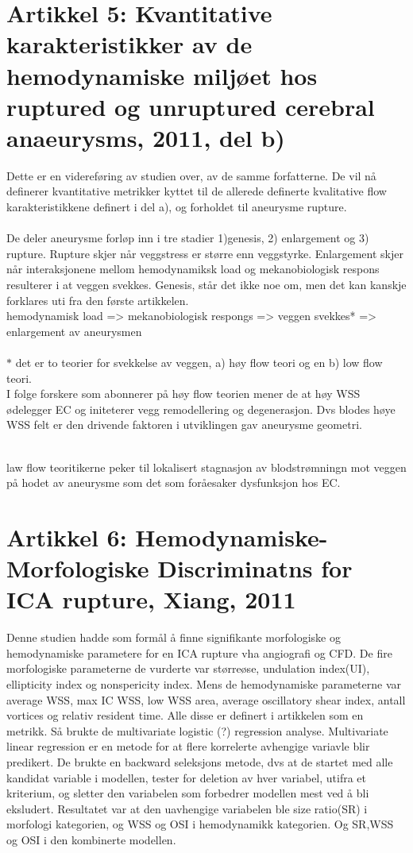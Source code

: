 \documentclass{article}
\begin{document}
\section{Artikkel 5: Kvantitative karakteristikker av de hemodynamiske miljøet hos ruptured og unruptured cerebral anaeurysms, 2011, del b)}

Dette er en videreføring av studien over, av de samme forfatterne. De vil nå definerer kvantitative metrikker kyttet til de allerede definerte kvalitative flow karakteristikkene definert i del a), og forholdet til aneurysme rupture. 
\\
\\De deler aneurysme forløp inn i tre stadier 1)genesis, 2) enlargement og 3) rupture. Rupture skjer når veggstress er større enn veggstyrke. Enlargement skjer når interaksjonene mellom hemodynamiksk load og mekanobiologisk respons resulterer i at veggen svekkes. 
Genesis, står det ikke noe om, men det kan kanskje forklares uti fra den første artikkelen. 
\\
hemodynamisk load => mekanobiologisk respongs => veggen svekkes* => enlargement av aneurysmen 
\\
\\$*$ det er to teorier for svekkelse av veggen, a) høy flow teori og en b) low flow teori. 
\\ I folge forskere som abonnerer på høy flow teorien mener de at høy WSS ødelegger EC og initeterer vegg remodellering og degenerasjon. Dvs blodes høye WSS felt er den drivende faktoren i utviklingen gav aneurysme geometri. 

\\law flow teoritikerne peker til lokalisert stagnasjon av blodstrømningn mot veggen på hodet av aneurysme som det som foråesaker dysfunksjon hos EC.

\section{Artikkel 6: Hemodynamiske- Morfologiske Discriminatns for ICA rupture, Xiang, 2011 }

Denne studien hadde som formål å finne signifikante morfologiske og hemodynamiske parametere for en ICA rupture vha angiografi og CFD.
De fire morfologiske parameterne de vurderte var størreøse, undulation index(UI), ellipticity index og nonspericity index. Mens de hemodynamiske parameterne var average WSS, max IC WSS, low WSS area, average oscillatory shear index, antall vortices og relativ resident time. 
Alle disse er definert i artikkelen som en metrikk.
Så brukte de multivariate logistic (?) regression analyse. 
Multivariate linear regression er en metode for at flere korrelerte avhengige variavle blir predikert. De brukte en backward seleksjons metode, dvs at de startet med alle kandidat variable i modellen, tester for deletion av hver variabel, utifra et kriterium, og sletter den variabelen som forbedrer modellen mest ved å bli eksludert. 
Resultatet var at den uavhengige variabelen ble size ratio(SR) i morfologi kategorien, og WSS og OSI i hemodynamikk kategorien. 
Og SR,WSS og OSI i den kombinerte modellen. 
\end{document}
